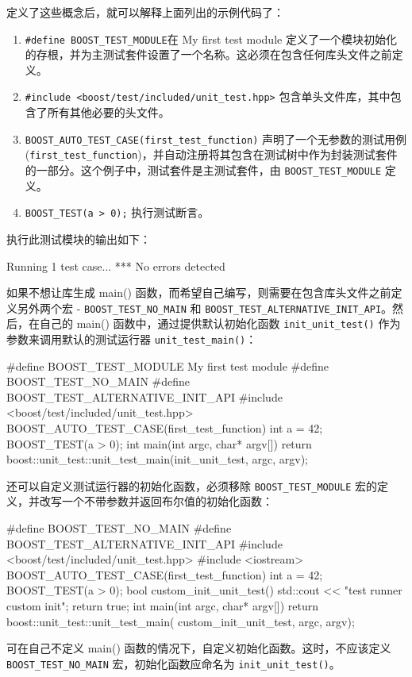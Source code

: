 定义了这些概念后，就可以解释上面列出的示例代码了：

\begin{enumerate}
\item
\verb|#define BOOST_TEST_MODULE|在 My first test module 定义了一个模块初始化的存根，并为主测试套件设置了一个名称。这必须在包含任何库头文件之前定义。

\item
\verb|#include <boost/test/included/unit_test.hpp>| 包含单头文件库，其中包含了所有其他必要的头文件。

\item
\verb|BOOST_AUTO_TEST_CASE(first_test_function)| 声明了一个无参数的测试用例 (\verb|first_test_function|)，并自动注册将其包含在测试树中作为封装测试套件的一部分。这个例子中，测试套件是主测试套件，由 \verb|BOOST_TEST_MODULE| 定义。

\item
\verb|BOOST_TEST(a > 0);| 执行测试断言。
\end{enumerate}

执行此测试模块的输出如下：

\begin{shell}
Running 1 test case...
*** No errors detected
\end{shell}


如果不想让库生成 main() 函数，而希望自己编写，则需要在包含库头文件之前定义另外两个宏 - \verb|BOOST_TEST_NO_MAIN| 和 \verb|BOOST_TEST_ALTERNATIVE_INIT_API|。然后，在自己的 main() 函数中，通过提供默认初始化函数 \verb|init_unit_test()| 作为参数来调用默认的测试运行器 \verb|unit_test_main()|：

\begin{cpp}
#define BOOST_TEST_MODULE My first test module
#define BOOST_TEST_NO_MAIN
#define BOOST_TEST_ALTERNATIVE_INIT_API
#include <boost/test/included/unit_test.hpp>
BOOST_AUTO_TEST_CASE(first_test_function)
{
    int a = 42;
    BOOST_TEST(a > 0);
}
int main(int argc, char* argv[])
{
    return boost::unit_test::unit_test_main(init_unit_test, argc, argv);
}
\end{cpp}

还可以自定义测试运行器的初始化函数，必须移除 \verb|BOOST_TEST_MODULE| 宏的定义，并改写一个不带参数并返回布尔值的初始化函数：

\begin{cpp}
#define BOOST_TEST_NO_MAIN
#define BOOST_TEST_ALTERNATIVE_INIT_API
#include <boost/test/included/unit_test.hpp>
#include <iostream>
BOOST_AUTO_TEST_CASE(first_test_function)
{
    int a = 42;
    BOOST_TEST(a > 0);
}
bool custom_init_unit_test()
{
    std::cout << "test runner custom init\n";
    return true;
}
int main(int argc, char* argv[])
{
    return boost::unit_test::unit_test_main(
        custom_init_unit_test, argc, argv);
}
\end{cpp}

\begin{myTip}
可在自己不定义 main() 函数的情况下，自定义初始化函数。这时，不应该定义 \verb|BOOST_TEST_NO_MAIN| 宏，初始化函数应命名为 \verb|init_unit_test()|。
\end{myTip}

